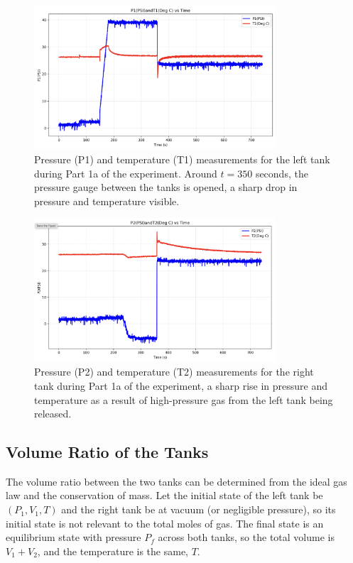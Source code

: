 \documentclass[12pt]{article}
\begin{document}
\begin{figure}[h!]
\centering
\includegraphics[width=0.8\textwidth]{1a-left_tank.png}
\caption{Pressure (P1) and temperature (T1) measurements for the left tank during Part 1a of the experiment. Around $t = 350$ seconds, the pressure gauge between the tanks is opened, a sharp drop in pressure and temperature visible.}
\label{fig:tank1_data_a}
\end{figure}

\begin{figure}[h!]
\centering
\includegraphics[width=0.8\textwidth]{1a-right_tank.png}
\caption{Pressure (P2) and temperature (T2) measurements for the right tank during Part 1a of the experiment, a sharp rise in pressure and temperature as a result of high-pressure gas from the left tank being released.}
\label{fig:tank2_data_a}
\end{figure}

\subsection*{Volume Ratio of the Tanks}
The volume ratio between the two tanks can be determined from the ideal gas law and the conservation of mass. Let the initial state of the left tank be $(P_1, V_1, T)$ and the right tank be at vacuum (or negligible pressure), so its initial state is not relevant to the total moles of gas. The final state is an equilibrium state with pressure $P_f$ across both tanks, so the total volume is $V_1 + V_2$, and the temperature is the same, $T$.
\end{document}
